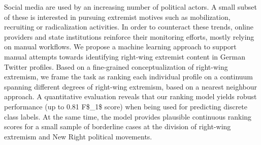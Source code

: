 Social media are used by an increasing number of political actors. A small subset of these is interested in pursuing extremist motives such as mobilization, recruiting or radicalization activities. In order to counteract these trends, online providers and state institutions reinforce their monitoring efforts, mostly relying on manual workflows. We propose a machine learning approach to support manual attempts towards identifying right-wing extremist content in German Twitter profiles. Based on a fine-grained conceptualization of right-wing extremism, we frame the task as ranking each individual profile on a continuum spanning different degrees of right-wing extremism, based on a nearest neighbour approach. A quantitative evaluation reveals that our ranking model yields robust performance (up to 0.81 F\$\_1\$ score) when being used for predicting discrete class labels. At the same time, the model provides plausible continuous ranking scores for a small sample of borderline cases at the division of right-wing extremism and New Right political movements.
